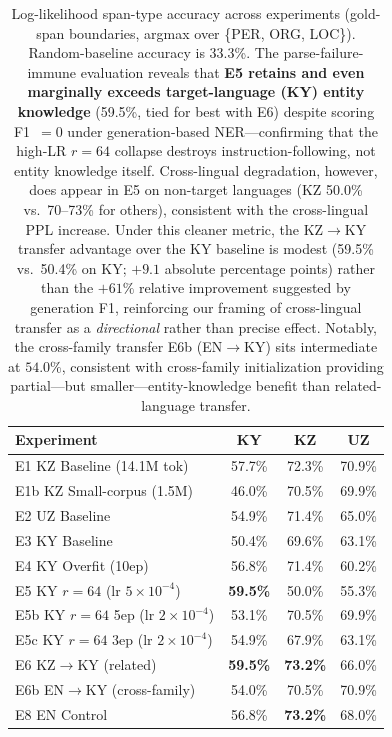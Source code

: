 \documentclass[11pt]{article}
\begin{document}
\begin{table}[t]
\centering
\small
\begin{tabular}{lccc}
\toprule
\textbf{Experiment} & \textbf{KY} & \textbf{KZ} & \textbf{UZ} \\
\midrule
E1 KZ Baseline (14.1M tok)   & 57.7\% & 72.3\% & 70.9\% \\
E1b KZ Small-corpus (1.5M)   & 46.0\% & 70.5\% & 69.9\% \\
E2 UZ Baseline               & 54.9\% & 71.4\% & 65.0\% \\
E3 KY Baseline               & 50.4\% & 69.6\% & 63.1\% \\
E4 KY Overfit (10ep)         & 56.8\% & 71.4\% & 60.2\% \\
E5 KY $r{=}64$ (lr $5{\times}10^{-4}$)  & \textbf{59.5\%} & 50.0\% & 55.3\% \\
E5b KY $r{=}64$ 5ep (lr $2{\times}10^{-4}$) & 53.1\% & 70.5\% & 69.9\% \\
E5c KY $r{=}64$ 3ep (lr $2{\times}10^{-4}$) & 54.9\% & 67.9\% & 63.1\% \\
E6 KZ$\rightarrow$KY (related)   & \textbf{59.5\%} & \textbf{73.2\%} & 66.0\% \\
E6b EN$\rightarrow$KY (cross-family) & 54.0\% & 70.5\% & 70.9\% \\
E8 EN Control                & 56.8\% & \textbf{73.2\%} & 68.0\% \\
\bottomrule
\end{tabular}
\caption{Log-likelihood span-type accuracy across experiments (gold-span boundaries, argmax over \{PER, ORG, LOC\}). Random-baseline accuracy is 33.3\%. The parse-failure-immune evaluation reveals that \textbf{E5 retains and even marginally exceeds target-language (KY) entity knowledge} (59.5\%, tied for best with E6) despite scoring F1~$= 0$ under generation-based NER---confirming that the high-LR $r{=}64$ collapse destroys instruction-following, not entity knowledge itself. Cross-lingual degradation, however, does appear in E5 on non-target languages (KZ 50.0\% vs.\ 70--73\% for others), consistent with the cross-lingual PPL increase. Under this cleaner metric, the KZ$\rightarrow$KY transfer advantage over the KY baseline is modest (59.5\% vs.\ 50.4\% on KY; $+9.1$ absolute percentage points) rather than the $+61\%$ relative improvement suggested by generation F1, reinforcing our framing of cross-lingual transfer as a \emph{directional} rather than precise effect. Notably, the cross-family transfer E6b (EN$\rightarrow$KY) sits intermediate at $54.0\%$, consistent with cross-family initialization providing partial---but smaller---entity-knowledge benefit than related-language transfer.}
\label{tab:ner_loglik}
\end{table}
\end{document}
